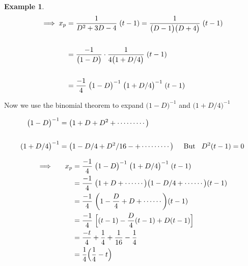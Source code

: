 \documentclass[11pt,a4paper]{article}
\theoremstyle{definition}
\newtheorem{exa}[thm]{Example}
\begin{document}
\begin{exa}
\begin{align*}
\implies x_p & = \frac{1}{D^2 + 3D - 4} \hspace{0.1cm} (t -1) = \frac{1}{\big(D - 1\big)\big(D + 4\big)}\hspace{0.1cm}(t-1)\\\\
& = \frac{-1}{\big(1 - D\big)}\cdot\frac{1}{4\big(1 + D/4\big)}\hspace{0.1cm}(t-1)\\\\
& = \frac{-1}{4}\hspace{0.1cm} \big(1 - D\big)^{-1} \hspace{0.1cm}\big(1 + D/4\big)^{-1}\hspace{0.1cm}(t-1)\\
\end{align*}

Now we use the binomial  theorem to expand $\big(1 - D\big)^{-1}$ and $\big(1 + D/4\big)^{-1}$

\begin{align*}
\big(1 - D\big)^{-1} & = \big(1 + D + D^2 + \cdots\cdots\cdots\big)\\\\
(1 + D/4\big)^{-1} & = \big(1 - D/4 + D^2/16 - + \cdots\cdots\cdots\big)\hspace{0.5cm} \text{But}\hspace{0.3cm} D^2(t-1) = 0
\end{align*}

\begin{align*}
\implies \hspace{0.5cm} x_p & = \frac{-1}{4}\hspace{0.1cm} \big(1 - D\big)^{-1} \hspace{0.1cm}\big(1 + D/4\big)^{-1}\hspace{0.1cm}(t-1)\\
& = \frac{-1}{4}\hspace{0.1cm}\big(1 + D + \cdots\cdots\big) \big(1 - D/4 + \cdots\cdots\big) (t -1)\\
& = \frac{-1}{4}\hspace{0.1cm}\bigg( 1 - \frac{D}{4} + D + \cdots\cdots\bigg) (t-1)\\
& = \frac{-1}{4}\hspace{0.1cm}\Big[ (t-1) - \frac{D}{4}(t -1) + D (t-1)\Big]\\
& = \frac{-t}{4} + \frac{1}{4} + \frac{1}{16} - \frac{1}{4}\\
& = \frac{1}{4}\Big(\frac{1}{4}-t\Big)
\end{align*}


\end{exa}
\end{document}
